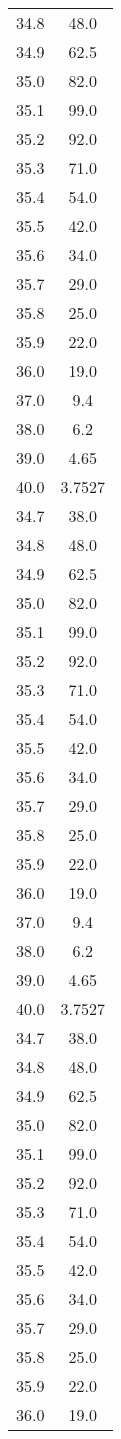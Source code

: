 \begin{table}
\begin{tabular}{S[]S[]}
34.8 & 48.0\\
34.9 & 62.5\\
35.0 & 82.0\\
35.1 & 99.0\\
35.2 & 92.0\\
35.3 & 71.0\\
35.4 & 54.0\\
35.5 & 42.0\\
35.6 & 34.0\\
35.7 & 29.0\\
35.8 & 25.0\\
35.9 & 22.0\\
36.0 & 19.0\\
37.0 & 9.4\\
38.0 & 6.2\\
39.0 & 4.65\\
40.0 & 3.7527\\
34.7 & 38.0\\
34.8 & 48.0\\
34.9 & 62.5\\
35.0 & 82.0\\
35.1 & 99.0\\
35.2 & 92.0\\
35.3 & 71.0\\
35.4 & 54.0\\
35.5 & 42.0\\
35.6 & 34.0\\
35.7 & 29.0\\
35.8 & 25.0\\
35.9 & 22.0\\
36.0 & 19.0\\
37.0 & 9.4\\
38.0 & 6.2\\
39.0 & 4.65\\
40.0 & 3.7527\\
34.7 & 38.0\\
34.8 & 48.0\\
34.9 & 62.5\\
35.0 & 82.0\\
35.1 & 99.0\\
35.2 & 92.0\\
35.3 & 71.0\\
35.4 & 54.0\\
35.5 & 42.0\\
35.6 & 34.0\\
35.7 & 29.0\\
35.8 & 25.0\\
35.9 & 22.0\\
36.0 & 19.0\\

\end{tabular}
\end{table}
